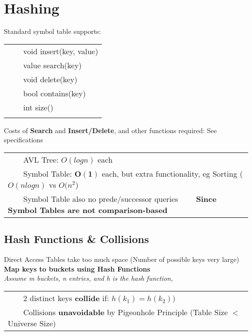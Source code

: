 \documentclass{article}
\newcommand{\tabitem}{~~\llap{\textbullet}~~}
\begin{document}
    \section{Hashing}
    
    Standard symbol table supports:

    \begin{tabular}{l}
        \tabitem void insert(key, value)\\
        \tabitem value search(key)\\
        \tabitem void delete(key)\\
        \tabitem bool contains(key)\\
        \tabitem int size()\\\\
    \end{tabular}


    Costs of \textbf{Search} and \textbf{Insert/Delete}, and other functions required: See specifications

    \begin{tabular}{l}
        \tabitem AVL Tree: $O(logn)$ each\\
        \tabitem Symbol Table: $\bm{O(1)}$ each, but extra functionality, eg Sorting ($O(nlogn)$ vs $O(n^{2}$)\\
        \tabitem Symbol Table also no prede/successor queries
        \tabitem \textbf{Since Symbol Tables are not comparison-based}\\
    \end{tabular}

    \subsection{Hash Functions \& Collisions}

    Direct Access Tables take too much space (Number of possible keys very large)\\

    \noindent\textbf{Map keys to buckets using Hash Functions}\\

    \noindent\emph{Assume m buckets, n entries, and h is the hash function,}\\
    
    \begin{tabular}{l}
        \tabitem 2 distinct keys \textbf{collide} if: $h(k_{1}) = h(k_{2}))$\\
        \tabitem Collisions \textbf{unavoidable} by Pigeonhole Principle (Table Size $<$ Universe Size)\\
    \end{tabular}
\end{document}
